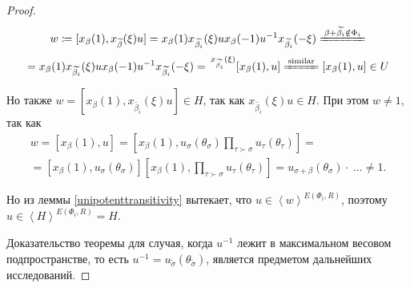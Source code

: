 \documentclass[10pt]{article}
\theoremstyle{remark}
\begin{document}
\begin{proof}
$$
w \coloneqq [x_\beta(1), x_{\widetilde{\beta}}(\xi)u] =
x_\beta(1) x_{\widetilde{\beta_i}}(\xi) u x_\beta(-1) u^{-1} x_{\widetilde{\beta_i}}(-\xi)
\xlongequal{\beta+\widetilde{\beta_i}\notin\Phi_i}$$
$$=x_\beta(1) x_{\widetilde{\beta_i}}(\xi) u x_\beta(-1) u^{-1} x_{\widetilde{\beta_i}}(-\xi) = \,
^{x_{\widetilde{\beta_i}}(\xi)}[x_\beta(1),u] \xlongequal{\text{similar}} [x_\beta(1),u] \in U
$$ 

Но также $ w = [x_\beta(1), x_{\widetilde{\beta_i}}(\xi)u] \in H$, так как $x_{\widetilde{\beta_i}}(\xi)u \in H$. При этом $w \ne 1$, так как
\begin{align*}
w = [x_\beta(1),u] = [x_\beta(1),u_\sigma(\theta_\sigma)\prod_{\tau\succ\sigma}u_\tau(\theta_\tau)] =\\
=[x_\beta(1),u_\sigma(\theta_\sigma)][x_\beta(1),\prod_{\tau\succ\sigma}u_\tau(\theta_\tau)]=
u_{\sigma+\beta}(\theta_\sigma)\cdot \;\ldots \ne 1.
\end{align*}

Но из леммы \ref{unipotenttransitivity} вытекает, что
$u \in \left<w\right>^{E(\Phi_i,R)}$, поэтому $u \in \left<H\right>^{E(\Phi_i,R)} = H$.

Доказательство теоремы для случая, когда $u^{-1}$ лежит в максимальном весовом подпространстве, то есть $u^{-1}=u_{\widetilde\sigma}(\theta_{\widetilde\sigma})$, является предметом дальнейших исследований.


\end{proof}


\end{document}
